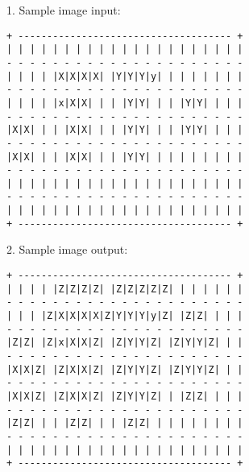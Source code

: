 \documentclass{article}
\begin{document}
1. Sample image input:
\begin{Verbatim}[samepage=true]
+ ------------------------------------- +
| | | | | | | | | | | | | | | | | | | | |
- - - - - - - - - - - - - - - - - - - - -
| | | | |X|X|X|X| |Y|Y|Y|y| | | | | | | |
- - - - - - - - - - - - - - - - - - - - -
| | | | |x|X|X| | | |Y|Y| | | |Y|Y| | | |
- - - - - - - - - - - - - - - - - - - - -
|X|X| | | |X|X| | | |Y|Y| | | |Y|Y| | | |
- - - - - - - - - - - - - - - - - - - - -
|X|X| | | |X|X| | | |Y|Y| | | | | | | | |
- - - - - - - - - - - - - - - - - - - - -
| | | | | | | | | | | | | | | | | | | | |
- - - - - - - - - - - - - - - - - - - - -
| | | | | | | | | | | | | | | | | | | | |
+ ------------------------------------- +
\end{Verbatim}

2. Sample image output:

\begin{Verbatim}[samepage=true]
+ ------------------------------------- +
| | | | |Z|Z|Z|Z| |Z|Z|Z|Z|Z| | | | | | |
- - - - - - - - - - - - - - - - - - - - -
| | | |Z|X|X|X|X|Z|Y|Y|Y|y|Z| |Z|Z| | | |
- - - - - - - - - - - - - - - - - - - - -
|Z|Z| |Z|x|X|X|Z| |Z|Y|Y|Z| |Z|Y|Y|Z| | |
- - - - - - - - - - - - - - - - - - - - -
|X|X|Z| |Z|X|X|Z| |Z|Y|Y|Z| |Z|Y|Y|Z| | |
- - - - - - - - - - - - - - - - - - - - -
|X|X|Z| |Z|X|X|Z| |Z|Y|Y|Z| | |Z|Z| | | |
- - - - - - - - - - - - - - - - - - - - -
|Z|Z| | | |Z|Z| | | |Z|Z| | | | | | | | |
- - - - - - - - - - - - - - - - - - - - -
| | | | | | | | | | | | | | | | | | | | |
+ ------------------------------------- +
\end{Verbatim}
\end{document}
